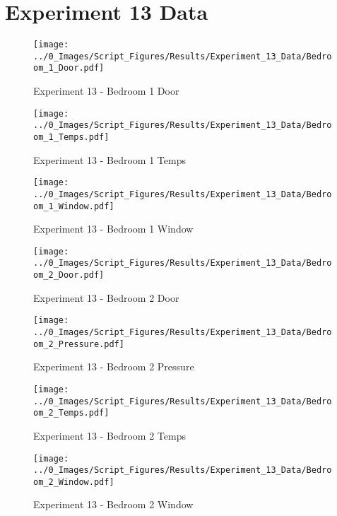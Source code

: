 \clearpage		\large
\section{Experiment 13 Data} \label{App:Exp13Results} 

	\begin{figure}[H]
		\centering
		\texttt{[image: ../0\_Images/Script\_Figures/Results/Experiment\_13\_Data/Bedroom\_1\_Door.pdf]}
		\caption[]{Experiment 13 - Bedroom 1 Door}
	\end{figure}
 

	\begin{figure}[H]
		\centering
		\texttt{[image: ../0\_Images/Script\_Figures/Results/Experiment\_13\_Data/Bedroom\_1\_Temps.pdf]}
		\caption[]{Experiment 13 - Bedroom 1 Temps}
	\end{figure}
 
	\clearpage

	\begin{figure}[H]
		\centering
		\texttt{[image: ../0\_Images/Script\_Figures/Results/Experiment\_13\_Data/Bedroom\_1\_Window.pdf]}
		\caption[]{Experiment 13 - Bedroom 1 Window}
	\end{figure}
 

	\begin{figure}[H]
		\centering
		\texttt{[image: ../0\_Images/Script\_Figures/Results/Experiment\_13\_Data/Bedroom\_2\_Door.pdf]}
		\caption[]{Experiment 13 - Bedroom 2 Door}
	\end{figure}
 
	\clearpage

	\begin{figure}[H]
		\centering
		\texttt{[image: ../0\_Images/Script\_Figures/Results/Experiment\_13\_Data/Bedroom\_2\_Pressure.pdf]}
		\caption[]{Experiment 13 - Bedroom 2 Pressure}
	\end{figure}
 

	\begin{figure}[H]
		\centering
		\texttt{[image: ../0\_Images/Script\_Figures/Results/Experiment\_13\_Data/Bedroom\_2\_Temps.pdf]}
		\caption[]{Experiment 13 - Bedroom 2 Temps}
	\end{figure}
 
	\clearpage

	\begin{figure}[H]
		\centering
		\texttt{[image: ../0\_Images/Script\_Figures/Results/Experiment\_13\_Data/Bedroom\_2\_Window.pdf]}
		\caption[]{Experiment 13 - Bedroom 2 Window}
	\end{figure}
 

